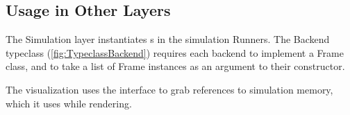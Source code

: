 \subsection{Usage in Other Layers}
The Simulation layer instantiates s in the simulation Runners.
The Backend typeclass (\cref{fig:TypeclassBackend}) requires each backend to implement a Frame class, and to take a list of Frame instances as an argument to their constructor.

The visualization uses the  interface to grab references to simulation memory, which it uses while rendering. %
